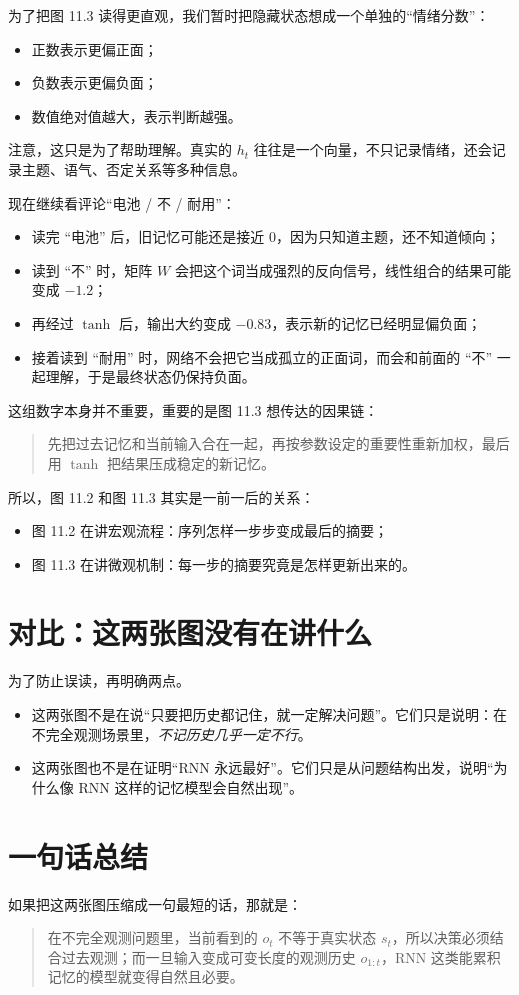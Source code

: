 \documentclass[12pt,a4paper]{ctexart}
\begin{document}
为了把图 11.3 读得更直观，我们暂时把隐藏状态想成一个单独的“情绪分数”：
\begin{itemize}
  \item 正数表示更偏正面；
  \item 负数表示更偏负面；
  \item 数值绝对值越大，表示判断越强。
\end{itemize}

注意，这只是为了帮助理解。真实的 \(h_t\) 往往是一个向量，不只记录情绪，还会记录主题、语气、否定关系等多种信息。

现在继续看评论“电池 / 不 / 耐用”：
\begin{itemize}
  \item 读完 “电池” 后，旧记忆可能还是接近 \(0\)，因为只知道主题，还不知道倾向；
  \item 读到 “不” 时，矩阵 \(W\) 会把这个词当成强烈的反向信号，线性组合的结果可能变成 \(-1.2\)；
  \item 再经过 \(\tanh\) 后，输出大约变成 \(-0.83\)，表示新的记忆已经明显偏负面；
  \item 接着读到 “耐用” 时，网络不会把它当成孤立的正面词，而会和前面的 “不” 一起理解，于是最终状态仍保持负面。
\end{itemize}

这组数字本身并不重要，重要的是图 11.3 想传达的因果链：
\begin{quote}
先把过去记忆和当前输入合在一起，再按参数设定的重要性重新加权，最后用 \(\tanh\) 把结果压成稳定的新记忆。
\end{quote}

所以，图 11.2 和图 11.3 其实是一前一后的关系：
\begin{itemize}
  \item 图 11.2 在讲宏观流程：序列怎样一步步变成最后的摘要；
  \item 图 11.3 在讲微观机制：每一步的摘要究竟是怎样更新出来的。
\end{itemize}

\section{对比：这两张图没有在讲什么}

为了防止误读，再明确两点。

\begin{itemize}
  \item 这两张图不是在说“只要把历史都记住，就一定解决问题”。它们只是说明：在不完全观测场景里，\emph{不记历史几乎一定不行}。
  \item 这两张图也不是在证明“RNN 永远最好”。它们只是从问题结构出发，说明“为什么像 RNN 这样的记忆模型会自然出现”。
\end{itemize}

\section{一句话总结}

如果把这两张图压缩成一句最短的话，那就是：
\begin{quote}
在不完全观测问题里，当前看到的 \(o_t\) 不等于真实状态 \(s_t\)，所以决策必须结合过去观测；而一旦输入变成可变长度的观测历史 \(o_{1:t}\)，RNN 这类能累积记忆的模型就变得自然且必要。
\end{quote}
\end{document}
